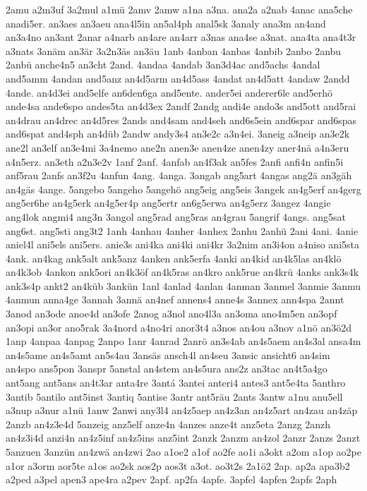 {2amu
a2m3uf
3a2mul
a1mü
2amv
2amw
a1na
a3na.
ana2a
a2nab
4anac
ana5che
anadi5er.
an3aes
an3aeu
ana4l5in
an5al4ph
anal5sk
3analy
ana3m
an4and
an3a4no
an3ant
2anar
a4narb
an4are
an4arr
a3nas
ana4se
a3nat.
ana4ta
ana4t3r
a3nats
3anäm
an3är
3a2n3äs
an3äu
1anb
4anban
4anbas
4anbib
2anbo
2anbu
2anbü
anche4n5
an3cht
2and.
4andaa
4andab
3an3d4ac
and5achs
4andal
and5amm
4andan
and5anz
an4d5arm
an4d5ass
4andat
an4d5att
4andaw
2andd
4ande.
an4d3ei
and5elfe
an6den6ga
and5ente.
ander5ei
anderer6le
and5erhö
ande4sa
ande6spo
andes5ta
an4d3ex
2andf
2andg
andi4e
ando3s
and5ott
and5rai
an4drau
an4drec
an4d5res
2ands
and4sam
and4seh
and6s5ein
and6spar
and6spas
and6spat
and4sph
an4düb
2andw
andy3s4
an3e2c
a3n4ei.
3aneig
a3neip
an3e2k
ane2l
an3elf
an3e4mi
3a4nemo
ane2n
anen3e
anen4ze
anen4zy
aner4nä
a4n3eru
a4n5erz.
an3eth
a2n3e2v
1anf
2anf.
4anfab
an4f3ak
an5fes
2anfi
anfi4n
anfin5i
anf5rau
2anfs
an3f2u
4anfun
4ang.
4anga.
3angab
ang5art
4angas
ang2ä
an3gäh
an4gäs
4ange.
5angebo
5angeho
5angehö
ang5eig
ang5eis
3angek
an4g5erf
an4gerg
ang5er6he
an4g5erk
an4g5er4p
ang5ertr
an6g5erwa
an4g5erz
3angez
4angie
ang4lok
angmi4
ang3n
3angol
ang5rad
ang5ras
an4grau
5angrif
4angs.
ang5sat
ang6st.
ang5sti
ang3t2
1anh
4anhau
4anher
4anhex
2anhu
2anhü
2ani
4ani.
4anie
aniel4l
ani5els
ani5ers.
anie3s
ani4ka
ani4ki
ani4kr
3a2nim
an3i4on
a4niso
ani5sta
4ank.
an4kag
ank5alt
ank5anz
4anken
ank5erfa
4anki
an4kid
an4k5las
an4klö
an4k3ob
4ankon
ank5ori
an4k3öf
an4k5ras
an4kro
ank5rue
an4krü
4anks
ank3s4k
ank3s4p
ankt2
an4küb
3ankün
1anl
4anlad
4anlan
4anman
3anmel
3anmie
3anmu
4anmun
anna4ge
3annah
3annä
an4nef
annens4
anne4s
3annex
ann4spa
2annt
3anod
an3ode
anoe4d
an3ofe
2anog
a3nol
ano4l3a
an3oma
ano4m5en
an3opf
an3opi
an3or
ano5rak
3a4nord
a4no4ri
anor3t4
a3nos
an4ou
a3nov
a1nö
an3ö2d
1anp
4anpaa
4anpag
2anpo
1anr
4anrad
2anrö
an3s4ab
an4s5aem
an4s3al
ansa4m
an4s5ame
an4s5amt
an5s4au
3ansäs
ansch4l
an4seu
3ansic
ansicht6
an4sim
an4spo
ans5pon
3anspr
5anstal
an4stem
an4s5ura
ans2z
an3tac
an4t5a4go
ant5ang
ant5ans
an4t3ar
anta4re
3antá
3antei
anteri4
antes3
ant5e4ta
5anthro
3antib
5antilo
ant5inst
3antiq
5antise
3antr
ant5räu
2ants
3antw
a1nu
anu5ell
a3nup
a3nur
a1nü
1anw
2anwi
any3l4
an4z5aep
an4z3an
an4z5art
an4zau
an4zäp
2anzb
an4z3e4d
5anzeig
anz5elf
anze4n
4anzes
anze4t
anz5eta
2anzg
2anzh
an4z3i4d
anzi4n
an4z5inf
an4z5ins
anz5int
2anzk
2anzm
an4zol
2anzr
2anzs
2anzt
5anzuen
3anzün
an4zwä
an4zwi
2ao
a1oe2
a1of
ao2fe
ao1i
a3okt
a2om
a1op
ao2pe
a1or
a3orm
aor5te
a1os
ao2sk
aos2p
aos3t
a3ot.
ao3t2s
2a1ö2
2ap.
ap2a
apa3b2
a2ped
a3pel
apen3
ape4ra
a2pev
2apf.
ap2fa
4apfe.
3apfel
4apfen
2apfs
2aph
}
